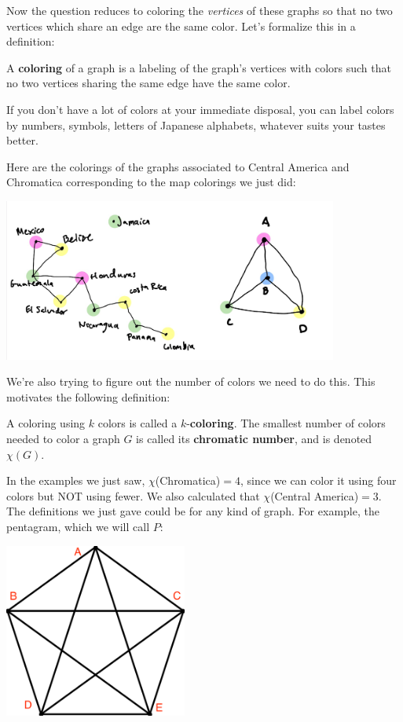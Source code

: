 Now the question reduces to coloring the \textit{vertices} of these graphs so that no two vertices which share an edge are the same color. Let's formalize this in a definition:

\begin{definition}
A \textbf{coloring} of a graph is a labeling of the graph’s vertices with colors such that no two vertices sharing the same edge have the same color.
\end{definition}

If you don't have a lot of colors at your immediate disposal, you can label colors by numbers, symbols, letters of Japanese alphabets, whatever suits your tastes better.

Here are the colorings of the graphs associated to Central America and Chromatica corresponding to the map colorings we just did:

\begin{center}
\includegraphics[width=11cm]{pics/map-graphs-colored.jpeg}
\end{center}

We're also trying to figure out the number of colors we need to do this. This motivates the following definition:

\begin{definition}
A coloring using $k$ colors is called a  $k$-\textbf{coloring}. The smallest number of colors needed to color a graph $G$ is called its \textbf{chromatic number}, and is denoted $\chi(G)$.
\end{definition}

In the examples we just saw, $\chi$(Chromatica)$=4$, since we can color it using four colors but NOT using fewer. We also calculated that $\chi$(Central America)$=3$.\\ 

The definitions we just gave could be for any kind of graph. For example, the pentagram, which we will call $P$:

\begin{center}
\includegraphics[width=6cm]{pics/Pentagram.png}
\end{center}

